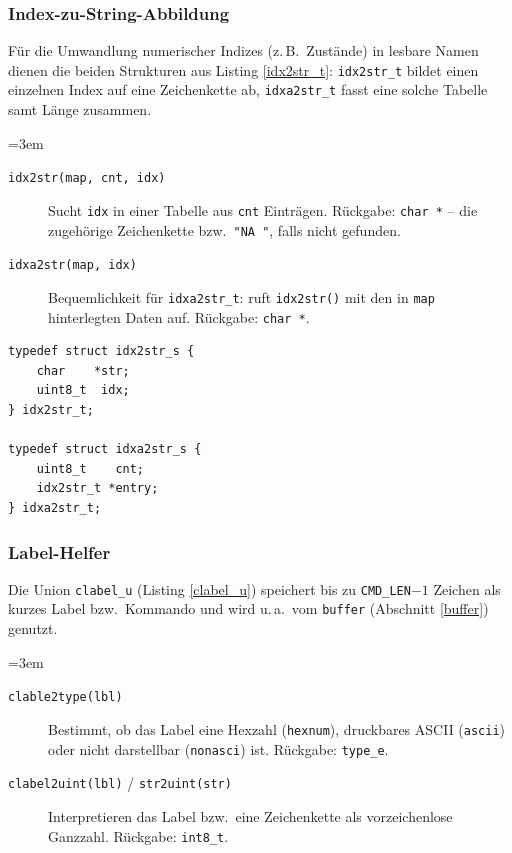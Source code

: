 \subsubsection*{Index-zu-String-Abbildung}
Für die Umwandlung numerischer Indizes (z.\,B.\ Zustände) in lesbare Namen
dienen die beiden Strukturen aus Listing \ref{idx2str_t}: \verb|idx2str_t|
bildet einen einzelnen Index auf eine Zeichenkette ab, \verb|idxa2str_t|
fasst eine solche Tabelle samt Länge zusammen.
{\sloppy\emergencystretch=3em
\begin{description}
\item[\texttt{idx2str(map, cnt, idx)}] Sucht \verb|idx| in einer Tabelle aus
  \verb|cnt| Einträgen. Rückgabe: \verb|char *| -- die zugehörige Zeichenkette
  bzw.\ \verb|"NA "|, falls nicht gefunden.
\item[\texttt{idxa2str(map, idx)}] Bequemlichkeit für \verb|idxa2str_t|: ruft
  \verb|idx2str()| mit den in \verb|map| hinterlegten Daten auf. Rückgabe:
  \verb|char *|.
\end{description}
\par}

\begin{listing}
\begin{verbatim}
typedef struct idx2str_s {
    char    *str;
    uint8_t  idx;
} idx2str_t;

typedef struct idxa2str_s {
    uint8_t    cnt;
    idx2str_t *entry;
} idxa2str_t;
\end{verbatim}
\caption{Lookup-Tabellen \texttt{idx2str\_t} / \texttt{idxa2str\_t}}
\label{idx2str_t}
\end{listing}

\subsubsection*{Label-Helfer}
Die Union \verb|clabel_u| (Listing \ref{clabel_u}) speichert bis zu
\verb|CMD_LEN|$-1$ Zeichen als kurzes Label bzw.\ Kommando und wird u.\,a.\
vom \verb|buffer| (Abschnitt \ref{buffer}) genutzt.
{\sloppy\emergencystretch=3em
\begin{description}
\item[\texttt{clable2type(lbl)}] Bestimmt, ob das Label eine Hexzahl
  (\verb|hexnum|), druckbares ASCII (\verb|ascii|) oder nicht darstellbar
  (\verb|nonasci|) ist. Rückgabe: \verb|type_e|.
\item[\texttt{clabel2uint(lbl)} / \texttt{str2uint(str)}] Interpretieren das
  Label bzw.\ eine Zeichenkette als vorzeichenlose Ganzzahl. Rückgabe:
  \verb|int8_t|.
\end{description}
\par}

